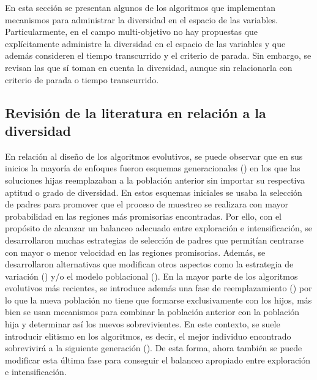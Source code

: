 
En esta sección se presentan algunos de los algoritmos que implementan mecanismos para administrar la diversidad en el 
espacio de las variables.
%
Particularmente, en el campo multi-objetivo no hay propuestas que explícitamente administre la diversidad en el espacio de 
las variables y que además consideren el tiempo transcurrido y el criterio de parada.
%
Sin embargo, se revisan las que sí toman en cuenta la diversidad, aunque sin relacionarla con criterio de parada o tiempo 
transcurrido.

\subsection{Revisión de la literatura en relación a la diversidad}

En relación al diseño de los algoritmos evolutivos, se puede observar que en sus inicios la mayoría de enfoques fueron 
esquemas generacionales (\cite{de2006evolutionary}) en los que las soluciones hijas reemplazaban a la población anterior 
sin importar su respectiva aptitud o grado de diversidad.
%
En estos esquemas iniciales se usaba la selección de padres para promover que el proceso de muestreo se realizara con mayor 
probabilidad en las regiones más promisorias encontradas. 
%
Por ello, con el propósito de alcanzar un balanceo adecuado entre exploración e intensificación, se desarrollaron muchas 
estrategias de selección de padres que permitían centrarse con mayor o menor velocidad en las regiones promisorias.
%
Además, se desarrollaron alternativas que modifican otros aspectos como la estrategia de variación (\cite{Joel:herrera2003fuzzy}) y/o 
el modelo poblacional (\cite{alba2005parallel}).
%
En la mayor parte de los algoritmos evolutivos más recientes, se introduce además una fase de 
reemplazamiento (\cite{eiben2003introduction}) por lo que la nueva población no tiene que formarse exclusivamente con los hijos, 
más bien se usan mecanismos para combinar la población anterior con la población hija y determinar así los nuevos 
sobrevivientes.
%
En este contexto, se suele introducir elitismo en los algoritmos, es decir, el mejor individuo encontrado sobrevivirá a la 
siguiente generación (\cite{Joel:CHC}).
%
De esta forma, ahora también se puede modificar esta última fase para conseguir el balanceo apropiado entre exploración e 
intensificación.

